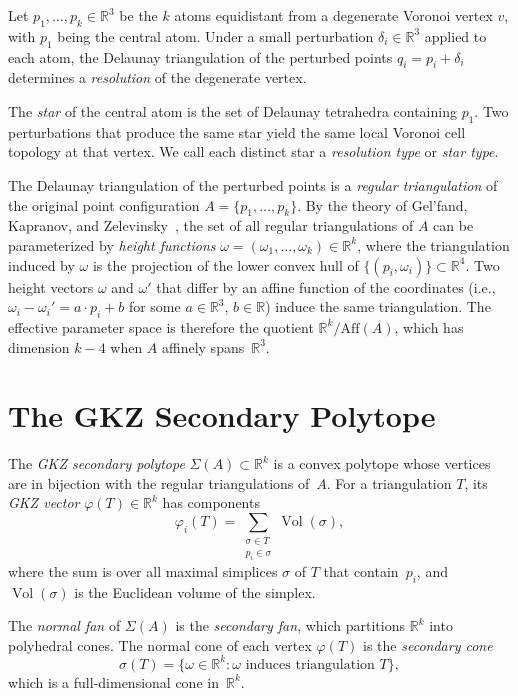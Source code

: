 \documentclass[11pt]{article}
\newcommand{\R}{\mathbb{R}}
\newcommand{\Vol}{\operatorname{Vol}}
\theoremstyle{definition}
\begin{document}
Let $p_1, \ldots, p_k \in \R^3$ be the $k$ atoms equidistant from a
degenerate Voronoi vertex $v$, with $p_1$ being the central atom.  Under
a small perturbation $\delta_i \in \R^3$ applied to each atom, the
Delaunay triangulation of the perturbed points $q_i = p_i + \delta_i$
determines a \emph{resolution} of the degenerate vertex.

The \emph{star} of the central atom is the set of Delaunay tetrahedra
containing $p_1$.  Two perturbations that produce the same star yield the
same local Voronoi cell topology at that vertex.  We call each distinct
star a \emph{resolution type} or \emph{star type}.

The Delaunay triangulation of the perturbed points is a \emph{regular
triangulation} of the original point configuration $A = \{p_1, \ldots,
p_k\}$.  By the theory of Gel'fand, Kapranov, and
Zelevinsky~\cite{gkz1994}, the set of all regular triangulations of $A$
can be parameterized by \emph{height functions} $\omega =
(\omega_1, \ldots, \omega_k) \in \R^k$, where the triangulation induced
by $\omega$ is the projection of the lower convex hull of
$\{(p_i, \omega_i)\} \subset \R^4$.  Two height vectors $\omega$ and
$\omega'$ that differ by an affine function of the coordinates (i.e.,
$\omega_i - \omega_i' = a \cdot p_i + b$ for some $a \in \R^3$,
$b \in \R$) induce the same triangulation.  The effective parameter space
is therefore the quotient $\R^k / \text{Aff}(A)$, which has dimension
$k - 4$ when $A$ affinely spans~$\R^3$.


\section{The GKZ Secondary Polytope}

The \emph{GKZ secondary polytope} $\Sigma(A) \subset \R^k$ is a convex
polytope whose vertices are in bijection with the regular triangulations
of~$A$.  For a triangulation $T$, its \emph{GKZ vector}
$\varphi(T) \in \R^k$ has components
\begin{equation}
  \varphi_i(T) = \sum_{\substack{\sigma \in T \\ p_i \in \sigma}}
  \Vol(\sigma),
  \label{eq:gkz}
\end{equation}
where the sum is over all maximal simplices $\sigma$ of $T$ that
contain~$p_i$, and $\Vol(\sigma)$ is the Euclidean volume of the
simplex.

The \emph{normal fan} of $\Sigma(A)$ is the \emph{secondary fan}, which
partitions $\R^k$ into polyhedral cones.  The normal cone of each vertex
$\varphi(T)$ is the \emph{secondary cone}
\[
  \sigma(T) = \bigl\{\omega \in \R^k : \text{$\omega$ induces
  triangulation } T\bigr\},
\]
which is a full-dimensional cone in~$\R^k$.
\end{document}

